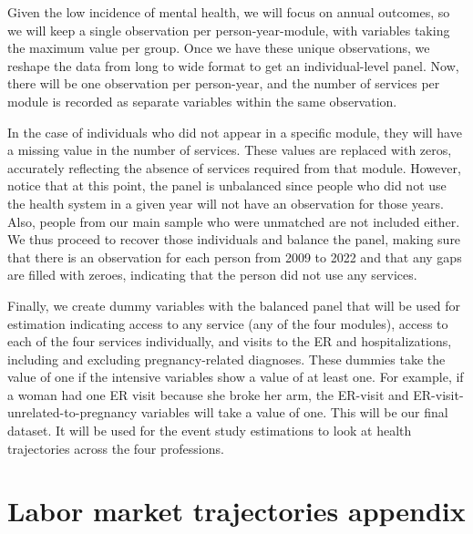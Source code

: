 \documentclass[12pt, a4paper]{article}
\begin{document}
Given the low incidence of mental health, we will focus on annual outcomes, so we will keep a single observation per person-year-module, with variables taking the maximum value per group. Once we have these unique observations, we reshape the data from long to wide format to get an individual-level panel. Now, there will be one observation per person-year, and the number of services per module is recorded as separate variables within the same observation. 

In the case of individuals who did not appear in a specific module, they will have a missing value in the number of services. These values are replaced with zeros, accurately reflecting the absence of services required from that module. However, notice that at this point, the panel is unbalanced since people who did not use the health system in a given year will not have an observation for those years. Also, people from our main sample who were unmatched are not included either. We thus proceed to recover those individuals and balance the panel, making sure that there is an observation for each person from 2009 to 2022 and that any gaps are filled with zeroes, indicating that the person did not use any services.

Finally, we create dummy variables with the balanced panel that will be used for estimation indicating access to any service (any of the four modules), access to each of the four services individually, and visits to the ER and hospitalizations, including and excluding pregnancy-related diagnoses. These dummies take the value of one if the intensive variables show a value of at least one. For example, if a woman had one ER visit because she broke her arm, the ER-visit and ER-visit-unrelated-to-pregnancy variables will take a value of one. This will be our final dataset. It will be used for the event study estimations to look at health trajectories across the four professions.


\section{Labor market trajectories appendix}
\end{document}
